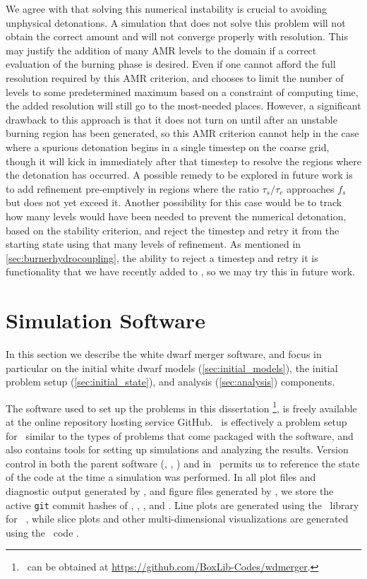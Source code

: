\documentclass[12pt]{article}
\begin{document}
We agree with \citet{kushnir:2013} that solving this numerical
instability is crucial to avoiding unphysical detonations.
A simulation that does not solve this problem will not obtain
the correct amount and will not converge properly with resolution.
This may justify the addition of many AMR levels to the domain
if a correct evaluation of the burning phase is desired.
Even if one cannot afford the full resolution required by this
AMR criterion, and chooses to limit the number of levels to some
predetermined maximum based on a constraint of computing time,
the added resolution will still go to the most-needed places.
However, a significant drawback to this approach is that it
does not turn on until after an unstable burning region has
been generated, so this AMR criterion cannot help in the case
where a spurious detonation begins in a single timestep on the coarse
grid, though it will kick in immediately after that timestep
to resolve the regions where the detonation has occurred.
A possible remedy to be explored in future work is to add
refinement pre-emptively in regions where the ratio $\tau_s / \tau_e$
approaches $f_{s}$ but does not yet exceed it. Another
possibility for this case would be to track how many levels
would have been needed to prevent the numerical detonation,
based on the stability criterion, and reject the timestep and
retry it from the starting state using that many levels of refinement.
As mentioned in \autoref{sec:burnerhydrocoupling}, the ability to
reject a timestep and retry it is functionality that
we have recently added to \castro, so we may try this in future work.



\newpage
\section{Simulation Software}
\label{sec:software}

In this section we describe the white dwarf merger software, and focus in
particular on the initial white dwarf models (\autoref{sec:initial_models}),
the initial problem setup (\autoref{sec:initial_state}), and analysis
(\autoref{sec:analysis}) components.

The software used to set up the problems in this dissertation
\wdmerger\footnote{\wdmerger\ can be obtained at \url{https://github.com/BoxLib-Codes/wdmerger}.},
is freely available at the online repository hosting service GitHub.
\wdmerger\ is effectively a problem setup for \castro\ similar to the types of
problems that come packaged with the software, and also contains tools for setting up
simulations and analyzing the results.
Version control in both the parent software (\boxlib, \castro, \microphysics) and in \wdmerger\
permits us to reference the state of the code at the time a simulation
was performed. In all plot files and diagnostic output generated by \castro,
and figure files generated by \wdmerger,
we store the active \texttt{git} commit hashes of \boxlib, \castro, \microphysics, and \wdmerger.
Line plots are generated using the \matplotlib\ library for \python\
\citep{matplotlib}, while slice plots and other multi-dimensional visualizations are
generated using the \yt\ code \citep{yt}.
\end{document}
